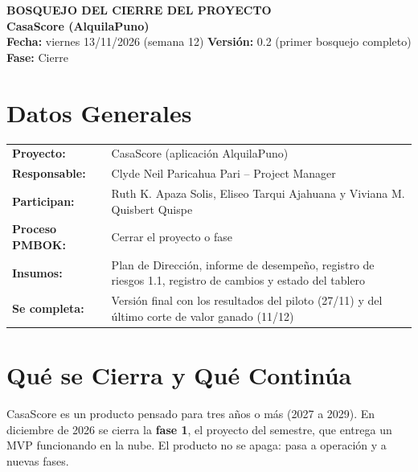 \documentclass[11pt,a4paper]{article}
\begin{document}
\begin{center}
    {\Large \textbf{\textcolor{AzulUNA}{BOSQUEJO DEL CIERRE DEL PROYECTO}}}\\[3pt]
    {\normalsize \textbf{CasaScore (AlquilaPuno)}}\\[4pt]
    \footnotesize \textbf{Fecha:} viernes 13/11/2026 (semana 12) \quad \textbar\quad \textbf{Versión:} 0.2 (primer bosquejo completo) \quad \textbar\quad \textbf{Fase:} Cierre
\end{center}

\vspace{0.1cm}

\section{Datos Generales}
{\small
\noindent\begin{tabularx}{\textwidth}{@{}P{4.0cm} L@{}}
\toprule
\textbf{Proyecto:} & CasaScore (aplicación AlquilaPuno) \\
\textbf{Responsable:} & Clyde Neil Paricahua Pari -- Project Manager \\
\textbf{Participan:} & Ruth K. Apaza Solis, Eliseo Tarqui Ajahuana y Viviana M. Quisbert Quispe \\
\textbf{Proceso PMBOK:} & Cerrar el proyecto o fase \\
\textbf{Insumos:} & Plan de Dirección, informe de desempeño, registro de riesgos 1.1, registro de cambios y estado del tablero \\
\textbf{Se completa:} & Versión final con los resultados del piloto (27/11) y del último corte de valor ganado (11/12) \\
\bottomrule
\end{tabularx}
}

\section{Qué se Cierra y Qué Continúa}
CasaScore es un producto pensado para tres años o más (2027 a 2029). En diciembre de 2026 se cierra la \textbf{fase 1}, el proyecto del semestre, que entrega un MVP funcionando en la nube. El producto no se apaga: pasa a operación y a nuevas fases.
\end{document}
